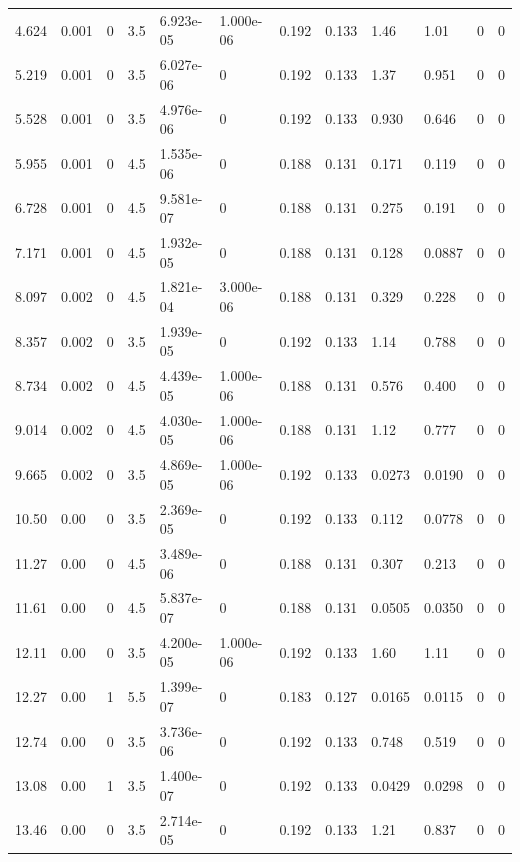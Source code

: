 \documentclass[preview]{standalone}
\begin{document}
{{\begin{tabular}{L{1.2cm}C{1.2cm} C{0.3cm}C{0.5cm} C{1.4cm}C{1.4cm} C{1.4cm}C{1.4cm} C{1.6cm}C{1.6cm} C{1.6cm}C{1.6cm}}
  4.624  &  0.001  & 0     & 3.5 &  6.923e-05  & 1.000e-06  &  0.192&   0.133& 1.46 & 1.01   &  0 & 0  \\ 
  5.219  &  0.001  & 0     & 3.5 &  6.027e-06  & 0  &  0.192&   0.133& 1.37 & 0.951   &  0 & 0  \\ 
  5.528  &  0.001  & 0     & 3.5 &  4.976e-06  & 0  &  0.192&   0.133& 0.930 & 0.646   &  0 & 0  \\ 
  5.955  &  0.001  & 0     & 4.5 &  1.535e-06  & 0  &  0.188&   0.131& 0.171 & 0.119   &  0 & 0  \\ 
  6.728  &  0.001  & 0     & 4.5 &  9.581e-07  & 0  &  0.188&   0.131& 0.275 & 0.191   &  0 & 0  \\ 
  7.171  &  0.001  & 0     & 4.5 &  1.932e-05  & 0  &  0.188&   0.131& 0.128 & 0.0887   &  0 & 0  \\ 
  8.097  &  0.002  & 0     & 4.5 &  1.821e-04  & 3.000e-06  &  0.188&   0.131& 0.329 & 0.228   &  0 & 0  \\ 
  8.357  &  0.002  & 0     & 3.5 &  1.939e-05  & 0  &  0.192&   0.133& 1.14 & 0.788   &  0 & 0  \\ 
  8.734  &  0.002  & 0     & 4.5 &  4.439e-05  & 1.000e-06  &  0.188&   0.131& 0.576 & 0.400   &  0 & 0  \\ 
  9.014  &  0.002  & 0     & 4.5 &  4.030e-05  & 1.000e-06  &  0.188&   0.131& 1.12 & 0.777   &  0 & 0  \\ 
  9.665  &  0.002  & 0     & 3.5 &  4.869e-05  & 1.000e-06  &  0.192&   0.133& 0.0273 & 0.0190   &  0 & 0  \\ 
  10.50  &  0.00  & 0     & 3.5 &  2.369e-05  & 0  &  0.192&   0.133& 0.112 & 0.0778   &  0 & 0  \\ 
  11.27  &  0.00  & 0     & 4.5 &  3.489e-06  & 0  &  0.188&   0.131& 0.307 & 0.213   &  0 & 0  \\ 
  11.61  &  0.00  & 0     & 4.5 &  5.837e-07  & 0  &  0.188&   0.131& 0.0505 & 0.0350   &  0 & 0  \\ 
  12.11  &  0.00  & 0     & 3.5 &  4.200e-05  & 1.000e-06  &  0.192&   0.133& 1.60 & 1.11   &  0 & 0  \\ 
  12.27  &  0.00  & 1     & 5.5 &  1.399e-07  & 0  &  0.183&   0.127& 0.0165 & 0.0115   &  0 & 0  \\ 
  12.74  &  0.00  & 0     & 3.5 &  3.736e-06  & 0  &  0.192&   0.133& 0.748 & 0.519   &  0 & 0  \\ 
  13.08  &  0.00  & 1     & 3.5 &  1.400e-07  & 0  &  0.192&   0.133& 0.0429 & 0.0298   &  0 & 0  \\ 
  13.46  &  0.00  & 0     & 3.5 &  2.714e-05  & 0  &  0.192&   0.133& 1.21 & 0.837   &  0 & 0  \\ 

\end{tabular}}}
\end{document}
